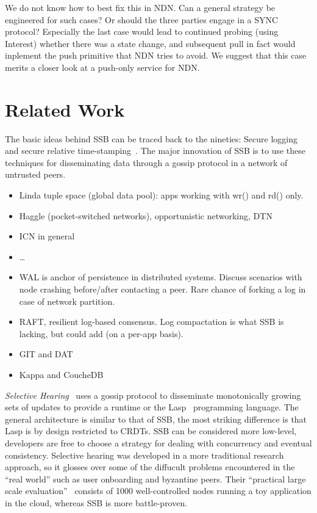 \documentclass[10pt,sigconf]{acmart}
\begin{document}
We do not know how to best fix this in NDN. Can a general strategy be
engineered for such cases? Or should the three parties engage in a
SYNC protocol? Especially the last case would lead to continued
probing (using Interest) whether there was a state change, and
subsequent pull in fact would inplement the push primitive that NDN
tries to avoid. We suggest that this case merits a closer look at a
push-only service for NDN.

\section{Related Work}

The basic ideas behind SSB can be traced back to the nineties: Secure logging~\cite{schneier1998cryptographic} and secure relative time-stamping~\cite{haber1990time}. The major innovation of SSB is to use these techniques for disseminating data through a gossip protocol in a network of untrusted peers.

\begin{itemize}
\item Linda tuple space (global data pool): apps working with wr() and rd() only.
\item Haggle (pocket-switched networks), opportunistic networking, DTN
\item ICN in general
\item \ldots
\item WAL is anchor of persistence in distributed systems. Discuss scenarios with node crashing before/after contacting a peer. Rare chance of forking a log in case of network partition.
\item RAFT, resilient log-based consensus. Log compactation is what SSB is lacking, but could add (on a per-app basis).
\item GIT and DAT
\item Kappa and CoucheDB
\end{itemize}

\textit{Selective Hearing}~\cite{meiklejohn2015selective} uses a gossip protocol to disseminate monotonically growing sets of updates to provide a runtime or the Lasp~\cite{meiklejohn2015lasp} programming language. The general architecture is similar to that of SSB, the most striking difference is that Lasp is by design restricted to CRDTs. SSB can be considered more low-level, developers are free to choose a strategy for dealing with concurrency and eventual consistency. Selective hearing was developed in a more traditional research approach, so it glosses over some of the diffucult problems encountered in the ``real world'' such as user onboarding and byzantine peers. Their ``practical large scale evaluation''~\cite{meiklejohn2017lasp} consists of 1000 well-controlled nodes running a toy application in the cloud, whereas SSB is more battle-proven.
\end{document}
